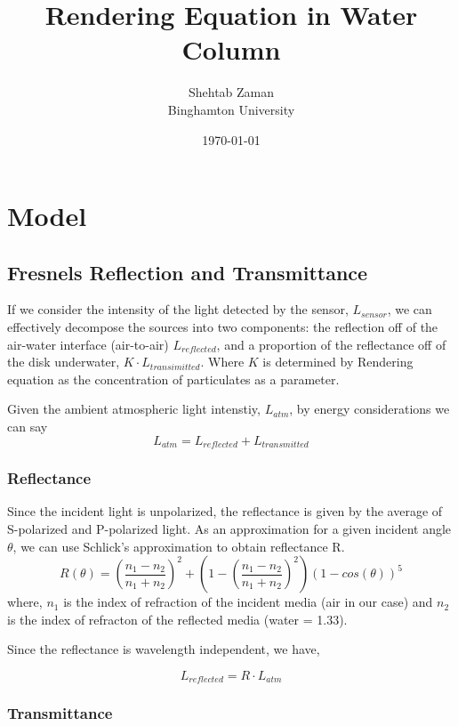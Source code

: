 \documentclass{article}
\title{Rendering Equation in Water Column}
\author{Shehtab Zaman \\ Binghamton University}
\date{\today}
\begin{document}

\maketitle
\section{Model}
\subsection{Fresnels Reflection and Transmittance}

If we consider the intensity of the light detected by the sensor, $ L_{sensor}$, we can
effectively decompose the sources into two components: the reflection off of the air-water
interface (air-to-air) $L_{reflected}$, and a proportion of the reflectance off of
the disk underwater, $K \cdot L_{transimitted}$. Where
$ K$ is determined by Rendering equation as the concentration of particulates as a parameter.

Given the ambient atmospheric light intenstiy, $L_{atm}$, by energy considerations we can say
$$L_{atm} = L_{reflected}+L_{transmitted}$$

\subsubsection{Reflectance}
Since the incident light is unpolarized, the reflectance is given
by the average of S-polarized and P-polarized light. As an approximation
for a given incident angle $\theta$, we can use Schlick's approximation to obtain
reflectance R.
$$ R(\theta) = \left(\frac{n_1-n_2}{n_1+n_2}\right)^2 +
 \left(1-\left(\frac{n_1-n_2}{n_1+n_2}\right)^2\right)\left(1-cos(\theta)\right)^5 $$
where, $ n_1$ is the index of refraction of the incident media (air in our case)
and $ n_2$ is the index of refracton of the reflected media (water = 1.33).

Since the reflectance is wavelength independent, we have,

$$ L_{reflected} = R \cdot L_{atm}$$

\subsubsection{Transmittance}
\end{document}
